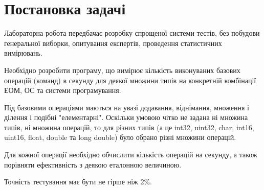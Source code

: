 \section{Постановка задачі}
	
Лабораторна робота передбачає розробку спрощеної системи тестів, без побудови генеральної виборки, опитування експертів, проведення статистичних вимірювань.

Необхідно розробити програму, що вимірює кількість виконуваних базових операцій (команд) в секунду для деякої множини типів на конкретній комбінації ЕОМ, ОС та системи програмування. 

Під базовими операціями маються на увазі додавання, віднімання, множення і ділення і подібні "елементарні". Оскільки умовою чітко не задана ні множина типів, ні множина операцій, то для різних типів (а це int32, uint32, char, int16, uint16, float, double та long double) було обрано  різні множини операцій.

Для кожної операції необхідно обчислити кількість операцій на секунду, а також порівняти ефективність з деякою еталонною величиною.  

Точність тестування має бути не гірше ніж 2\%.

